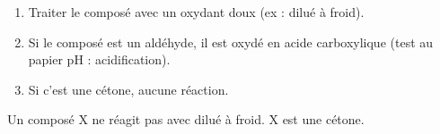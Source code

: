 \begin{enumerate}
    \item Traiter le composé avec un oxydant doux (ex :  dilué à froid).
    \item Si le composé est un aldéhyde, il est oxydé en acide carboxylique (test au papier pH : acidification).
    \item Si c'est une cétone, aucune réaction.
\end{enumerate}
\begin{exemple}
Un composé X ne réagit pas avec  dilué à froid. X est une cétone.
\end{exemple}